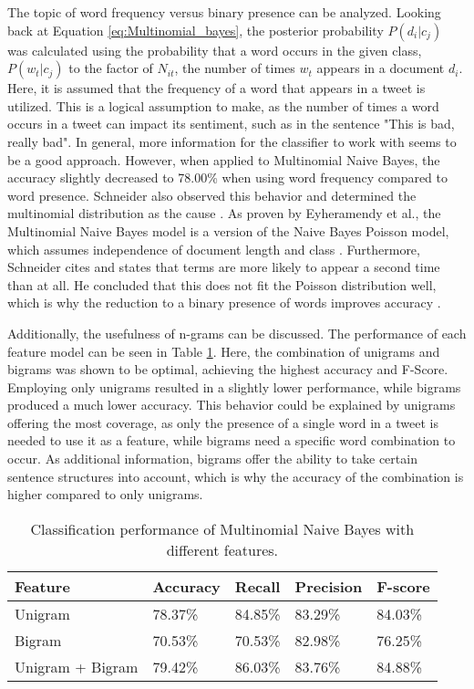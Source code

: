 The topic of word frequency versus binary presence can be analyzed. Looking back at Equation \eqref{eq:Multinomial_bayes}, the posterior probability $P(d_i|c_j)$ was calculated using the probability that a word occurs in the given class, $P(w_t|c_j)$ to the factor of $N_{it}$, the number of times $w_t$ appears in a document $d_i$. Here, it is  assumed that the frequency of a word that appears in a tweet is utilized. This is a logical assumption to make, as the number of times a word occurs in a tweet can impact its sentiment, such as in the sentence "This is bad, really bad". In general, more information for the classifier to work with seems to be a good approach. However, when applied to Multinomial Naive Bayes, the accuracy slightly decreased to 78.00\% when using word frequency compared to word presence. Schneider also observed this behavior and determined the multinomial distribution as the cause \cite{nb_freq}. As proven by Eyheramendy et al., the Multinomial Naive Bayes model is a version of the Naive Bayes Poisson model, which assumes independence of document length and class \cite{Poisson}. Furthermore, Schneider cites \cite{Poisson_words} and states that terms are more likely to appear a second time than at all. He concluded that this does not fit the Poisson distribution well, which is why the reduction to a binary presence of words improves accuracy \cite{nb_freq}.

Additionally, the usefulness of n-grams can be discussed. The performance of each feature model can be seen in Table \ref{tab:eval_features}. Here, the combination of unigrams and bigrams was shown to be optimal, achieving the highest accuracy and F-Score. Employing only unigrams resulted in a slightly lower performance, while bigrams produced a much lower accuracy. This behavior could be explained by unigrams offering the most coverage, as only the presence of a single word in a tweet is needed to use it as a feature, while bigrams need a specific word combination to occur. As additional information, bigrams offer the ability to take certain sentence structures into account, which is why the accuracy of the combination is higher compared to only unigrams.

\begin{table}
\centering
\caption{Classification performance of Multinomial Naive Bayes with different features.}
\begin{tabular}{ |p{4cm}||p{2cm}|p{2cm}|p{2cm}|p{2cm}| }
 \hline
 Feature &     Accuracy &      Recall &     Precision& F-score \\
 \hline
 Unigram & 78.37\% & 84.85\% & 83.29\% & 84.03\% \\
  \hline
 Bigram & 70.53\% & 70.53\% & 82.98\% & 76.25\% \\
 \hline
 Unigram + Bigram  & 79.42\%&        86.03\%&       83.76\%& 84.88\%\\
 \hline
\end{tabular}
\label{tab:eval_features}
\end{table}


